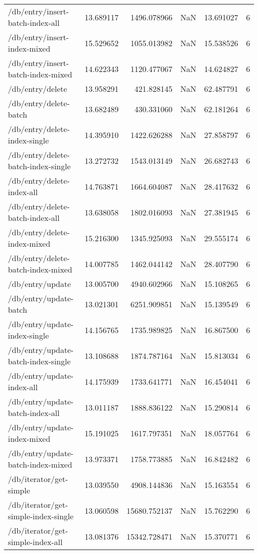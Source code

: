 \begin{longtable}{lrrrrr}
/db/entry/insert-batch-index-all & 13.689117 & 1496.078966 & NaN & 13.691027 & 6 \\
/db/entry/insert-index-mixed & 15.529652 & 1055.013982 & NaN & 15.538526 & 6 \\
/db/entry/insert-batch-index-mixed & 14.622343 & 1120.477067 & NaN & 14.624827 & 6 \\
/db/entry/delete & 13.958291 & 421.828145 & NaN & 62.487791 & 6 \\
/db/entry/delete-batch & 13.682489 & 430.331060 & NaN & 62.181264 & 6 \\
/db/entry/delete-index-single & 14.395910 & 1422.626288 & NaN & 27.858797 & 6 \\
/db/entry/delete-batch-index-single & 13.272732 & 1543.013149 & NaN & 26.682743 & 6 \\
/db/entry/delete-index-all & 14.763871 & 1664.604087 & NaN & 28.417632 & 6 \\
/db/entry/delete-batch-index-all & 13.638058 & 1802.016093 & NaN & 27.381945 & 6 \\
/db/entry/delete-index-mixed & 15.216300 & 1345.925093 & NaN & 29.555174 & 6 \\
/db/entry/delete-batch-index-mixed & 14.007785 & 1462.044142 & NaN & 28.407790 & 6 \\
/db/entry/update & 13.005700 & 4940.602966 & NaN & 15.108265 & 6 \\
/db/entry/update-batch & 13.021301 & 6251.909851 & NaN & 15.139549 & 6 \\
/db/entry/update-index-single & 14.156765 & 1735.989825 & NaN & 16.867500 & 6 \\
/db/entry/update-batch-index-single & 13.108688 & 1874.787164 & NaN & 15.813034 & 6 \\
/db/entry/update-index-all & 14.175939 & 1733.641771 & NaN & 16.454041 & 6 \\
/db/entry/update-batch-index-all & 13.011187 & 1888.836122 & NaN & 15.290814 & 6 \\
/db/entry/update-index-mixed & 15.191025 & 1617.797351 & NaN & 18.057764 & 6 \\
/db/entry/update-batch-index-mixed & 13.973371 & 1758.773885 & NaN & 16.842482 & 6 \\
/db/iterator/get-simple & 13.039550 & 4908.144836 & NaN & 15.163554 & 6 \\
/db/iterator/get-simple-index-single & 13.060598 & 15680.752137 & NaN & 15.762290 & 6 \\
/db/iterator/get-simple-index-all & 13.081376 & 15342.728471 & NaN & 15.370771 & 6 \\

\end{longtable}
